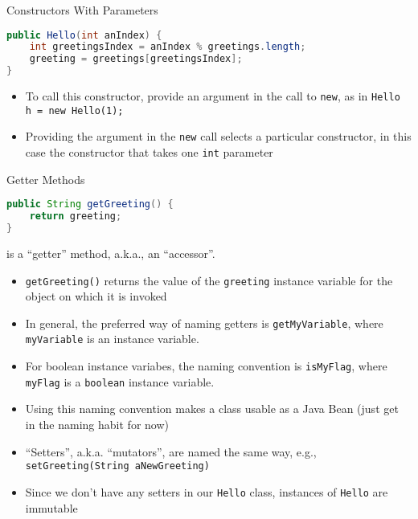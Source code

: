 \documentclass{beamer}
\begin{document}
\begin{frame}[fragile]{Constructors With Parameters}


\begin{lstlisting}[language=Java]
public Hello(int anIndex) {
    int greetingsIndex = anIndex % greetings.length;
    greeting = greetings[greetingsIndex];
}
\end{lstlisting}

\begin{itemize}
\item To call this constructor, provide an argument in the call to {\tt new}, as in {\tt Hello h = new Hello(1);}
\item Providing the argument in the {\tt new} call selects a particular constructor, in this case the constructor that takes one {\tt int} parameter
\end{itemize}


\end{frame}

\begin{frame}[fragile]{Getter Methods}

\vspace{-.1in}
\begin{lstlisting}[language=Java]
public String getGreeting() {
    return greeting;
}
\end{lstlisting}
\vspace{-.1in}
is a ``getter'' method, a.k.a., an ``accessor''.
\begin{itemize}
\item {\tt getGreeting()} returns the value of the {\tt greeting} instance variable for the object on which it is invoked
\item In general, the preferred way of naming getters is {\tt getMyVariable}, where {\tt myVariable} is an instance variable.
\item For boolean instance variabes, the naming convention is {\tt isMyFlag}, where {\tt myFlag} is a {\tt boolean} instance variable.
\item Using this naming convention makes a class usable as a Java Bean (just get in the naming habit for now)
\item ``Setters'', a.k.a. ``mutators'', are named the same way, e.g., {\tt setGreeting(String aNewGreeting)}
\item Since we don't have any setters in our {\tt Hello} class, instances of {\tt Hello} are immutable
\end{itemize}


\end{frame}
\end{document}
